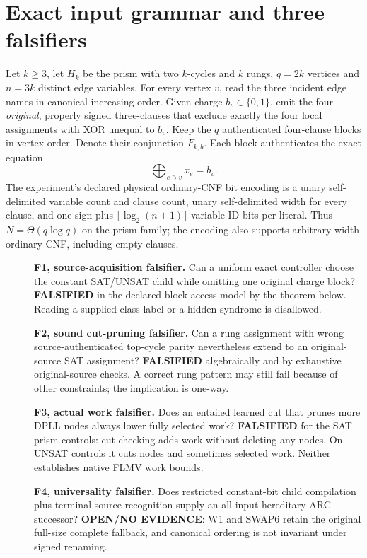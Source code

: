 \documentclass[11pt]{article}
\begin{document}
\section{Exact input grammar and three falsifiers}
Let $k\geq3$, let $H_k$ be the prism with two $k$-cycles and $k$ rungs, $q=2k$ vertices and $n=3k$ distinct edge variables. For every vertex $v$, read the three incident edge names in canonical increasing order. Given charge $b_v\in\{0,1\}$, emit the four \emph{original}, properly signed three-clauses that exclude exactly the four local assignments with XOR unequal to $b_v$. Keep the $q$ authenticated four-clause blocks in vertex order. Denote their conjunction $F_{k,b}$. Each block authenticates the exact equation
\[
 \bigoplus_{e\ni v}x_e=b_v.
\]
The experiment's declared physical ordinary-CNF bit encoding is a unary self-delimited variable count and clause count, unary self-delimited width for every clause, and one sign plus $\lceil\log_2(n+1)\rceil$ variable-ID bits per literal. Thus $N=\Theta(q\log q)$ on the prism family; the encoding also supports arbitrary-width ordinary CNF, including empty clauses.

\begin{description}
\item[]\textbf{F1, source-acquisition falsifier.} Can a uniform exact controller choose the constant SAT/UNSAT child while omitting one original charge block? \textbf{FALSIFIED} in the declared block-access model by the theorem below. Reading a supplied class label or a hidden syndrome is disallowed.
\item[]\textbf{F2, sound cut-pruning falsifier.} Can a rung assignment with wrong source-authenticated top-cycle parity nevertheless extend to an original-source SAT assignment? \textbf{FALSIFIED} algebraically and by exhaustive original-source checks. A correct rung pattern may still fail because of other constraints; the implication is one-way.
\item[]\textbf{F3, actual work falsifier.} Does an entailed learned cut that prunes more DPLL nodes always lower fully selected work? \textbf{FALSIFIED} for the SAT prism controls: cut checking adds work without deleting any nodes. On UNSAT controls it cuts nodes and sometimes selected work. Neither establishes native FLMV work bounds.
\item[]\textbf{F4, universality falsifier.} Does restricted constant-bit child compilation plus terminal source recognition supply an all-input hereditary ARC successor? \textbf{OPEN/NO EVIDENCE}: W1 and SWAP6 retain the original full-size complete fallback, and canonical ordering is not invariant under signed renaming.
\end{description}
\end{document}
